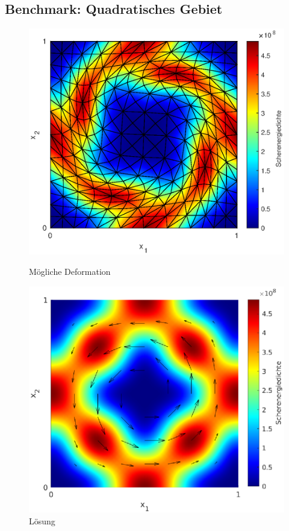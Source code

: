 \documentclass{scrartcl}
\begin{document}
\subsection{Benchmark: Quadratisches Gebiet}\begin{figure}[h]
\centering
\begin{minipage}[t]{0.45\textwidth}
\centering
\includegraphics[width=\textwidth]{Plots/SquareBenchmarkDeform5}
\caption{Mögliche Deformation}
\label{pl:SquareBenchmarkDeform}
\end{minipage}
\hfill
\begin{minipage}[t]{0.45\textwidth}
\centering
\includegraphics[width=\textwidth]{Plots/SquareBenchmarkSoln3}
\caption{Lösung}
\label{pl:SquareBenmarkSoln}
\end{minipage}
\end{figure}
\end{document}
